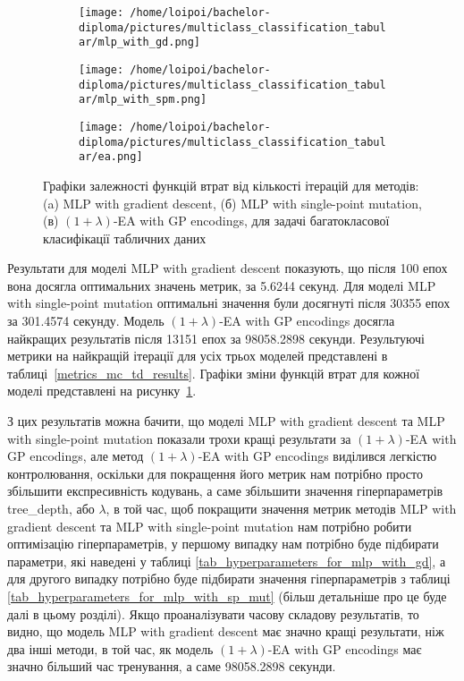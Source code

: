 \begin{figure}[ht]
	\centering
	\begin{subfigure}[b]{0.32\textwidth}    
		\texttt{[image: /home/loipoi/bachelor-diploma/pictures/multiclass\_classification\_tabular/mlp\_with\_gd.png]}
		\caption{}
	\end{subfigure}	
	\begin{subfigure}[b]{0.32\textwidth}
		\texttt{[image: /home/loipoi/bachelor-diploma/pictures/multiclass\_classification\_tabular/mlp\_with\_spm.png]}
		\caption{}
	\end{subfigure}	
	\begin{subfigure}[b]{0.32\textwidth}
		\texttt{[image: /home/loipoi/bachelor-diploma/pictures/multiclass\_classification\_tabular/ea.png]}
		\caption{}
	\end{subfigure}
	
	\caption{Графіки залежності функцій втрат від кількості ітерацій для методів: (a) MLP with gradient descent, (б) MLP with single-point mutation, (в) $(1+\lambda)$-EA with GP encodings, для задачі багатокласової класифікації табличних даних}
	\label{fig_losses_mc_td}
\end{figure}

Результати для моделі MLP with gradient descent показують, що після 100 епох вона досягла оптимальних значень метрик, за 5.6244 секунд. Для моделі MLP with single-point mutation оптимальні значення були досягнуті після 30355 епох за 301.4574 секунду. Модель $(1+\lambda)$-EA with GP encodings досягла найкращих результатів після 13151 епох за 98058.2898 секунди. Результуючі метрики на найкращій ітерації для усіх трьох моделей представлені в таблиці~\ref{metrics_mc_td_results}. Графіки зміни функцій втрат для кожної моделі представлені на рисунку~\ref{fig_losses_mc_td}.

З цих результатів можна бачити, що моделі MLP with gradient descent та MLP with single-point mutation показали трохи кращі результати за $(1+\lambda)$-EA with GP encodings, але метод $(1+\lambda)$-EA with GP encodings виділився легкістю контролювання, оскільки для покращення його метрик нам потрібно просто збільшити експресивність кодувань, а саме збільшити значення гіперпараметрів tree\_depth, або $\lambda$, в той час, щоб покращити значення метрик методів MLP with gradient descent та MLP with single-point mutation нам потрібно робити оптимізацію гіперпараметрів, у першому випадку нам потрібно буде підбирати параметри, які наведені у таблиці \ref{tab_hyperparameters_for_mlp_with_gd}, а для другого випадку потрібно буде підбирати значення гіперпараметрів з таблиці \ref{tab_hyperparameters_for_mlp_with_sp_mut} (більш детальніше про це буде далі в цьому розділі). Якщо проаналізувати часову складову результатів, то видно, що модель MLP with gradient descent має значно кращі результати, ніж два інші методи, в той час, як модель $(1+\lambda)$-EA with GP encodings має значно більший час тренування, а саме 98058.2898 секунди.

